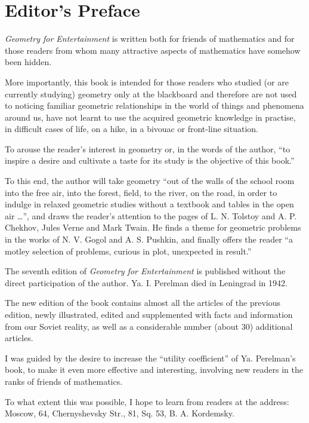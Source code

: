  \cleardoublepage

\chapter{Editor's Preface}
\label{editor-preface}


\emph{Geometry for Entertainment} is written both for friends of mathematics and for those readers from whom many attractive aspects of mathematics have somehow been hidden.

More importantly, this book is intended for those readers who studied (or are currently studying) geometry only at the blackboard and therefore are not used to noticing familiar geometric relationships in the world of things and phenomena around us, have not learnt to use the acquired geometric knowledge in practise, in difficult cases of life, on a hike, in a bivouac or front-line situation.

To arouse the reader's interest in geometry or, in the words of the author, ``to inspire a desire and cultivate a taste for its study is the objective of this book.''

To this end, the author will take geometry ``out of the walls of the school room into the free air, into the forest, field, to the river, on the road, in order to indulge in relaxed geometric studies without a textbook and tables in the open air \ldots{}'', and draws the reader's attention to the pages of L. N. Tolstoy and A. P. Chekhov, Jules Verne and Mark Twain. He finds a theme for geometric problems in the works of N. V. Gogol and A. S. Pushkin, and finally offers the reader ``a motley selection of problems, curious in plot, unexpected in result.''

The seventh edition of \emph{Geometry for Entertainment} is published without the direct participation of the author. Ya. I. Perelman died in Leningrad in 1942.

The new edition of the book contains almost all the articles of the previous edition, newly illustrated, edited and supplemented with facts and information from our Soviet reality, as well as a considerable number (about 30) additional articles.

I was guided by the desire to increase the ``utility coefficient'' of Ya. Perelman's book, to make it even more effective and interesting, involving new readers in the ranks of friends of mathematics.

To what extent this was possible, I hope to learn from readers at the address: Moscow, 64, Chernyshevsky Str., 81, Sq. 53, B. A. Kordemsky.


